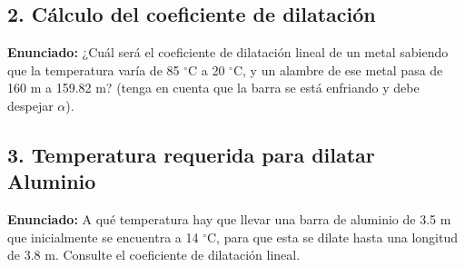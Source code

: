 \documentclass[12pt, letterpaper]{article}
\begin{document}
	
	\subsection*{2. Cálculo del coeficiente de dilatación}
	\noindent \textbf{Enunciado:} ¿Cuál será el coeficiente de dilatación lineal de un metal sabiendo que la temperatura varía de 85 $^{\circ}$C a 20 $^{\circ}$C, y un alambre de ese metal pasa de 160 m a 159.82 m? (tenga en cuenta que la barra se está enfriando y debe despejar $\alpha$).
	
	
	\subsection*{3. Temperatura requerida para dilatar Aluminio}
	\noindent \textbf{Enunciado:} A qué temperatura hay que llevar una barra de aluminio de 3.5 m que inicialmente se encuentra a 14 $^{\circ}$C, para que esta se dilate hasta una longitud de 3.8 m. Consulte el coeficiente de dilatación lineal.
	
\end{document}

